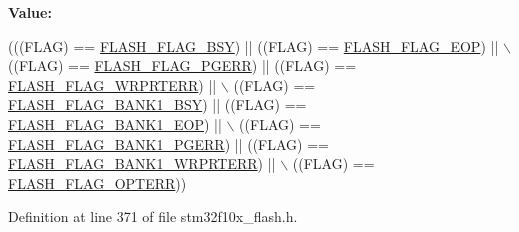 {\bfseries Value\+:}
\begin{DoxyCode}
(((FLAG) == \hyperlink{group___f_l_a_s_h___flags_gad3bc368f954ad7744deda3315da2fff7}{FLASH\_FLAG\_BSY}) || ((FLAG) == \hyperlink{group___f_l_a_s_h___flags_gaf043ba4d8f837350bfc7754a99fae5a9}{FLASH\_FLAG\_EOP}) || \(\backslash\)
                                  ((FLAG) == \hyperlink{group___f_l_a_s_h___flags_gae2ef62dee0a5ca01e6226746039b6f20}{FLASH\_FLAG\_PGERR}) || ((FLAG) == 
      \hyperlink{group___f_l_a_s_h___flags_ga5c59a7f07507cac38091275964d3d35d}{FLASH\_FLAG\_WRPRTERR}) || \(\backslash\)
                                  ((FLAG) == \hyperlink{group___f_l_a_s_h___flags_ga1f85e6d511503886e9fbe7d0228c97a4}{FLASH\_FLAG\_BANK1\_BSY}) || ((FLAG) == 
      \hyperlink{group___f_l_a_s_h___flags_gafa7670ee5ce8a2eb1f64c458a9f08e5b}{FLASH\_FLAG\_BANK1\_EOP}) || \(\backslash\)
                                  ((FLAG) == \hyperlink{group___f_l_a_s_h___flags_gaa1056ffdd1c434a2967d5ed7c0d263be}{FLASH\_FLAG\_BANK1\_PGERR}) || ((FLAG) == 
      \hyperlink{group___f_l_a_s_h___flags_ga1646345adbcda773ef25785b1bdc4c43}{FLASH\_FLAG\_BANK1\_WRPRTERR}) || \(\backslash\)
                                  ((FLAG) == \hyperlink{group___f_l_a_s_h___flags_gac36b0605df97c9414933369a32251e4a}{FLASH\_FLAG\_OPTERR}))
\end{DoxyCode}


Definition at line 371 of file stm32f10x\+\_\+flash.\+h.

